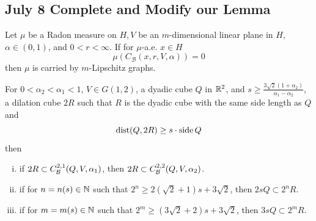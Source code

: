 \newpage
\subsection{July 8 Complete and Modify our Lemma}

\begin{corollary}\label{LisaCoro7.1}
    Let $\mu$ be a Radon measure on $H, V$ be an $m$-dimensional linear plane in $H$, $\alpha \in(0,1)$, and $0<r<\infty$. If for $\mu$-a.e. $x \in H$
    $$
    \mu\left(C_{\mathcal{B}}(x, r, V, \alpha)\right)=0
    $$
    then $\mu$ is carried by $m$-Lipschitz graphs.
\end{corollary}



\begin{lemma}\label{lemma:s-guarantee-containQ-between-2alpha}
    For $0<\alpha_2<\alpha_1<1$, $V\in G(1, 2)$, a dyadic cube $Q$ in $\mathbb{R}^2$, and $s\geq \frac{3\sqrt{2}(1+\alpha_2)}{\alpha_1-\alpha_2}$, a dilation cube $2R$ such that $R$ is the dyadic cube with the same side length as $Q$ and
    \begin{equation*}
        \operatorname{dist}(Q, 2R)\geq s\cdot \operatorname{side} Q
    \end{equation*}
    then
    \begin{enumerate}[(i)]
        \item \label{lemma-1:s-guarantee-containQ-between-2alpha} {\color{red} if $2R\subset C_\mathcal B^{2,1}(Q, V, \alpha_1)$, then $2R\subset  C_\mathcal B^{2,2}(Q, V, \alpha_2)$.}
        \item \label{lemma-2:s-guarantee-containQ-between-2alpha} if for $n = n(s) \in \mathbb{N}$ such that $2^n\geq 2(\sqrt{2}+1)s + 3\sqrt{2}$, then $2sQ\subset 2^n R $.
        \item \label{lemma-3:s-guarantee-containQ-between-2alpha} if for $m = m(s) \in \mathbb{N}$ such that $2^m \geq (3\sqrt{2}+2)s + 3\sqrt{2}$, then $3sQ\subset 2^m R$. 
    \end{enumerate}
\end{lemma}
